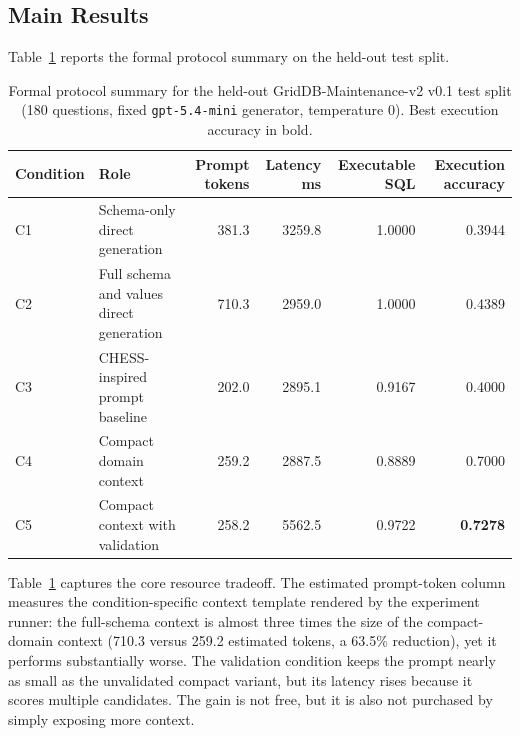 \documentclass{article}
\begin{document}
\subsection{Main Results}\label{sect:r1}

Table~\ref{tab:main-results} reports the formal protocol summary on the held-out test split.

\begin{table}[H]

\caption{Formal protocol summary for the held-out GridDB-Maintenance-v2 v0.1 test split (180 questions, fixed \texttt{gpt-5.4-mini} generator, temperature 0). Best execution accuracy in bold.}
\label{tab:main-results}
\centering

\begin{tabular}{llrrrr}
\toprule
\textbf{Condition} & \textbf{Role} & \textbf{Prompt tokens} & \textbf{Latency ms} & \textbf{Executable SQL} & \textbf{Execution accuracy} \\
\midrule
C1 & Schema-only direct generation & 381.3 & 3259.8 & 1.0000 & 0.3944 \\
C2 & Full schema and values direct generation & 710.3 & 2959.0 & 1.0000 & 0.4389 \\
C3 & CHESS-inspired prompt baseline & 202.0 & 2895.1 & 0.9167 & 0.4000 \\
C4 & Compact domain context & 259.2 & 2887.5 & 0.8889 & 0.7000 \\
C5 & Compact context with validation & 258.2 & 5562.5 & 0.9722 & \textbf{0.7278} \\
\bottomrule
\end{tabular}

\end{table}

Table~\ref{tab:main-results} captures the core resource tradeoff. The estimated prompt-token column measures the condition-specific context template rendered by the experiment runner: the full-schema context is almost three times the size of the compact-domain context (710.3 versus 259.2 estimated tokens, a 63.5\% reduction), yet it performs substantially worse. The validation condition keeps the prompt nearly as small as the unvalidated compact variant, but its latency rises because it scores multiple candidates. The gain is not free, but it is also not purchased by simply exposing more context.
\end{document}
